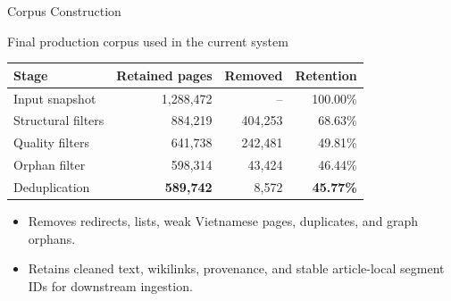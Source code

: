 \documentclass[aspectratio=169]{beamer}
\newcommand{\best}[1]{\textcolor{fptOrange}{\textbf{#1}}}
\begin{document}
\begin{frame}{Corpus Construction}
\small
\centering
\begin{block}{Final production corpus used in the current system}
\begin{tabular}{lrrr}
\toprule
Stage & Retained pages & Removed & Retention \\
\midrule
Input snapshot & 1,288,472 & -- & 100.00\% \\
Structural filters & 884,219 & 404,253 & 68.63\% \\
Quality filters & 641,738 & 242,481 & 49.81\% \\
Orphan filter & 598,314 & 43,424 & 46.44\% \\
Deduplication & \best{589,742} & 8,572 & \best{45.77\%} \\
\bottomrule
\end{tabular}
\end{block}
\vspace{.45cm}
\begin{itemize}
\item Removes redirects, lists, weak Vietnamese pages, duplicates, and graph orphans.
\item Retains cleaned text, wikilinks, provenance, and stable article-local segment IDs for downstream ingestion.
\end{itemize}
\end{frame}
\end{document}
